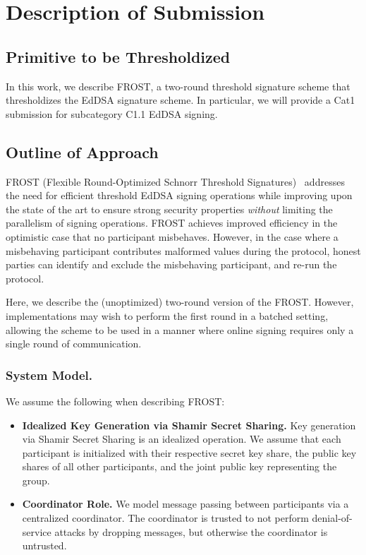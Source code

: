 \section{Description of Submission}

\subsection{Primitive to be Thresholdized}

In this work, we describe FROST, a two-round threshold signature
scheme that thresholdizes the EdDSA signature scheme. In particular,
we will provide a Cat1 submission for subcategory C1.1 EdDSA signing.

\subsection{Outline of Approach}

FROST (Flexible Round-Optimized Schnorr Threshold Signatures)~\cite{KomloG20,BellareCKMTZ22}
addresses the need for efficient threshold EdDSA signing operations while
improving upon the state of the art to ensure strong security properties
\emph{without} limiting the parallelism of signing operations.
FROST achieves improved efficiency in the optimistic case that no
participant misbehaves. However, in the case where a misbehaving participant 
contributes malformed values during the protocol, honest parties can identify
and exclude the misbehaving participant, and re-run the protocol.

Here, we describe the (unoptimized) two-round version of the FROST.
However, implementations may wish to perform the first round in a
batched setting, allowing the scheme to be used in a manner where
online signing requires only a single round of communication.

\subsubsection{System Model.}
We assume the following when describing FROST:

\begin{itemize}[itemsep=0.5em]
\item \textbf{Idealized Key Generation via Shamir Secret Sharing.} Key generation via Shamir Secret Sharing is an idealized operation.
We assume that each participant is initialized with their respective secret key share,
the public key shares of all other participants,
and the joint public key representing the group.
\item \textbf{Coordinator Role.} We model message passing between participants
via a centralized coordinator.
The coordinator is trusted to not perform denial-of-service attacks by dropping messages,
but otherwise the coordinator is untrusted.
\end{itemize}

